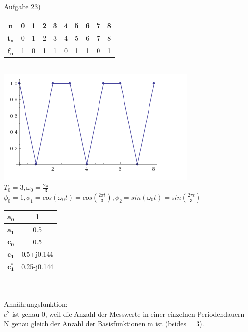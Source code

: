 

	Aufgabe 23)\\
	 \begin{tabular}{|c|c|c|c|c|c|c|c|c|c|}
		\hline
		$\mathbf{n}$   & 0 & 1 & 2 & 3   & 4 & 5 & 6 & 7 & 8 \\
		\hline
		$\mathbf{t_n}$ & 0 & 1 & 2 & 3   & 4 & 5 & 6 & 7 & 8 \\
		\hline
		$\mathbf{f_n}$ & 1 & 0 & 1 & 1 & 0 & 1 & 1 & 0 & 1\\
		\hline
	\end{tabular} \\
	\includegraphics{A23_plot.png}\\
	$T_0 = 3, \omega _0 = \frac{2\pi}{3}$\\
	$\phi _0 = 1, \phi _1 = cos(\omega _0t) = cos(\frac{2\pi t}{3}), \phi _2 = sin(\omega _0t) = sin(\frac{2\pi t}{3})$\\
	
	\begin{tabular}{|c|c|}
		\hline
		$\mathbf{a_0}$   & 1  \\
		\hline
		$\mathbf{a_1}$ 	& 0.5  \\
		\hline
		$\mathbf{c_0}$   & 0.5  \\
		\hline
		$\mathbf{c_1}$ & 0.5+j0.144  \\
		\hline
		$\mathbf{c_1^*}$ & 0.25-j0.144  \\
		\hline
	\end{tabular} \\\\
	Ann\"ahrungsfunktion: \\

	$e^2$ ist genau 0, weil die Anzahl der Messwerte in einer einzelnen Periodendauern N genau gleich der Anzahl der Basisfunktionen m ist (beides = 3).
	
